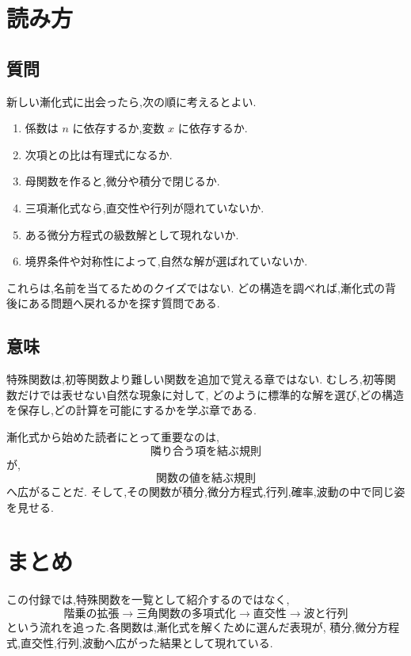 \section{読み方}

\subsection{質問}

新しい漸化式に出会ったら,次の順に考えるとよい.

\begin{enumerate}
  \item 係数は $n$ に依存するか,変数 $x$ に依存するか.
  \item 次項との比は有理式になるか.
  \item 母関数を作ると,微分や積分で閉じるか.
  \item 三項漸化式なら,直交性や行列が隠れていないか.
  \item ある微分方程式の級数解として現れないか.
  \item 境界条件や対称性によって,自然な解が選ばれていないか.
\end{enumerate}

これらは,名前を当てるためのクイズではない.
どの構造を調べれば,漸化式の背後にある問題へ戻れるかを探す質問である.

\subsection{意味}

特殊関数は,初等関数より難しい関数を追加で覚える章ではない.
むしろ,初等関数だけでは表せない自然な現象に対して,
どのように標準的な解を選び,どの構造を保存し,どの計算を可能にするかを学ぶ章である.

漸化式から始めた読者にとって重要なのは,
\[
  \text{隣り合う項を結ぶ規則}
\]
が,
\[
  \text{関数の値を結ぶ規則}
\]
へ広がることだ.
そして,その関数が積分,微分方程式,行列,確率,波動の中で同じ姿を見せる.

\section*{まとめ}

この付録では,特殊関数を一覧として紹介するのではなく,
\[
  \text{階乗の拡張}
  \longrightarrow
  \text{三角関数の多項式化}
  \longrightarrow
  \text{直交性}
  \longrightarrow
  \text{波と行列}
\]
という流れを追った.各関数は,漸化式を解くために選んだ表現が,
積分,微分方程式,直交性,行列,波動へ広がった結果として現れている.
